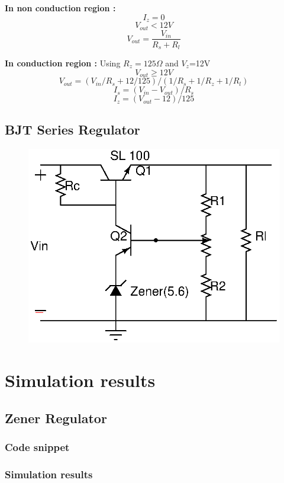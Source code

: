 \documentclass[12pt]{article}
\begin{document}
\textbf{In non conduction region : }
$$I_{z} = 0$$
$$V_{out} < 12V$$
$$V_{out}=\frac{V_{in}}{R_s+R_l}$$

\textbf{In conduction region : }
Using $R_{z}=125\Omega$ and $V_{z}$=12V
$$V_{out} \ge 12V$$
$$V_{out} = (V_{in}/R_s+12/125)/(1/R_s+1/R_z+1/R_l)$$
$$I_s=(V_{in}-V_{out})/R_s$$
$$I_z=(V_{out}-12)/125$$

\subsection{BJT Series Regulator}
\begin{figure}[H]
  \begin{center}
    \includegraphics{BJT.eps}
\end{center}
\end{figure}

\newpage
\section{Simulation results}

\subsection{Zener Regulator}
\subsubsection{Code snippet}

\subsubsection{Simulation results}
\end{document}
